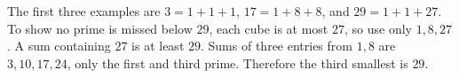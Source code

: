 The first three examples are $ 3=1+1+1 $, $ 17=1+8+8 $, and $ 29=1+1+27 $. To show no prime is missed below $ 29 $, each cube is at most $ 27 $, so use only $ 1,8,27 $. A sum containing $ 27 $ is at least $ 29 $. Sums of three entries from $ 1,8 $ are $ 3,10,17,24 $, only the first and third prime. Therefore the third smallest is $\boxed{29}$.
